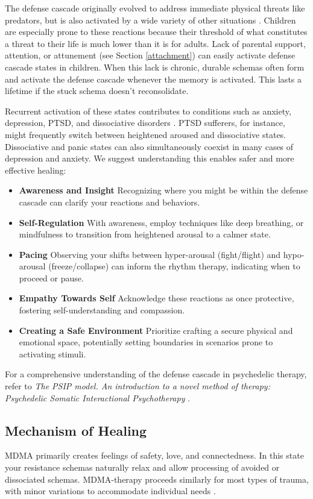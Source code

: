 \documentclass[12pt,letterpaper]{article}
\begin{document}
The defense cascade originally evolved to address immediate physical threats like predators, but is also activated by a wide variety of other situations \cite{razviPSIP}. Children are especially prone to these reactions because their threshold of what constitutes a threat to their life is much lower than it is for adults. Lack of parental support, attention, or attunement (see Section \ref{attachment}) can easily activate defense cascade states in children. When this lack is chronic, durable schemas often form and activate the defense cascade whenever the memory is activated. This lasts a lifetime if the stuck schema doesn't reconsolidate.

Recurrent activation of these states contributes to conditions such as anxiety, depression, PTSD, and dissociative disorders \cite{razviPSIP}. PTSD sufferers, for instance, might frequently switch between heightened aroused and dissociative states. Dissociative and panic states can also simultaneously coexist in many cases of depression and anxiety. We suggest understanding this enables safer and more effective healing: 
\begin{itemize}
    \item \textbf{Awareness and Insight} Recognizing where you might be within the defense cascade can clarify your reactions and behaviors.
    \item \textbf{Self-Regulation} With awareness, employ techniques like deep breathing, or mindfulness to transition from heightened arousal to a calmer state.
    \item \textbf{Pacing} Observing your shifts between hyper-arousal (fight/flight) and hypo-arousal (freeze/collapse) can inform the rhythm therapy, indicating when to proceed or pause.
    \item \textbf{Empathy Towards Self} Acknowledge these reactions as once protective, fostering self-understanding and compassion.
    \item \textbf{Creating a Safe Environment} Prioritize crafting a secure physical and emotional space, potentially setting boundaries in scenarios prone to activating stimuli.
\end{itemize}

For a comprehensive understanding of the defense cascade in psychedelic therapy, refer to \textit{The PSIP model. An introduction to a novel method of therapy: Psychedelic Somatic Interactional Psychotherapy} \cite{razviPSIP}.
\subsection{Mechanism of Healing}
MDMA primarily creates feelings of safety, love, and connectedness. In this state your resistance schemas naturally relax and allow processing of avoided or dissociated schemas. MDMA-therapy proceeds similarly for most types of trauma, with minor variations to accommodate individual needs \cite{otaloraMDMA}. 
\end{document}
